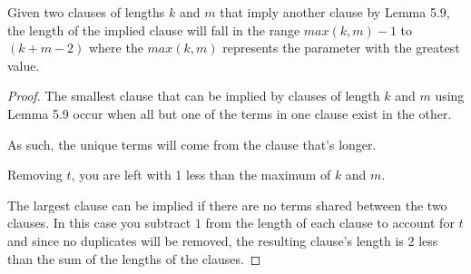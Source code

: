 \documentclass[manuscript]{acmart}
\begin{document}
    \begin{lemma}
        Given two clauses of lengths $k$ and $m$ that imply another clause by Lemma 5.9, the length of the implied clause will fall in the range $max(k, m)-1$ to $(k + m - 2)$ where the $max(k, m)$ represents the parameter with the greatest value.
    \end{lemma}
    \begin{proof}
        The smallest clause that can be implied by clauses of length $k$ and $m$ using Lemma 5.9 occur when all but one of the terms in one clause exist in the other.

        As such, the unique terms will come from the clause that's longer.

        Removing $t$, you are left with 1 less than the maximum of $k$ and $m$.

        The largest clause can be implied if there are no terms shared between the two clauses. In this case you subtract $1$ from the length of each clause to account for $t$ and since no duplicates will be removed, the resulting clause's length is $2$ less than the sum of the lengths of 
        the clauses.
    \end{proof}
\end{document}
